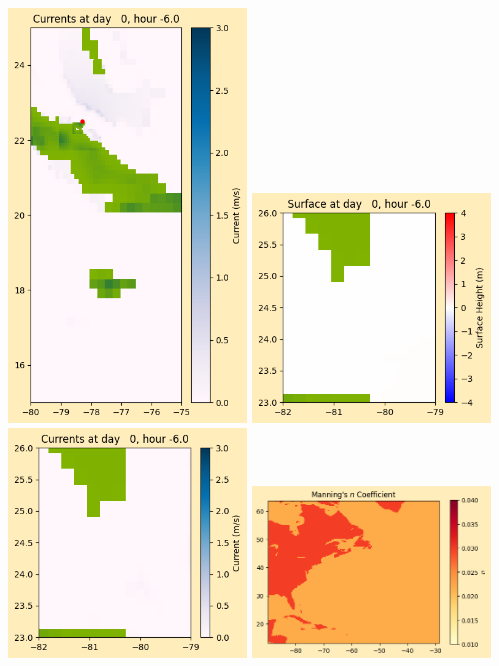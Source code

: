 \documentclass[11pt]{article}
\begin{document}
\includegraphics[width=0.475\textwidth]{frame0011fig1008.png}
\vskip 10pt 
\includegraphics[width=0.475\textwidth]{frame0011fig1009.png}
\includegraphics[width=0.475\textwidth]{frame0011fig1010.png}
\vskip 10pt 
\includegraphics[width=0.475\textwidth]{frame0011fig1011.png}
\end{document}
